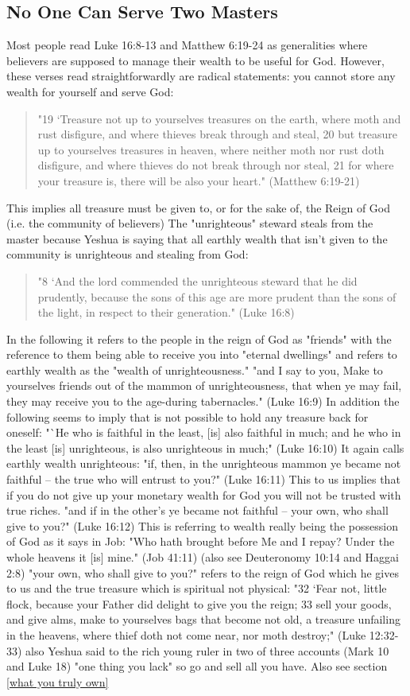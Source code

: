 \documentclass[11pt]{article}
\begin{document}
\subsection{No One Can Serve Two Masters}
Most people read Luke 16:8-13 and Matthew 6:19-24 as generalities where believers are supposed to manage their wealth to be useful for God. However, these verses read straightforwardly are radical statements: you cannot store any wealth for yourself and serve God:
\begin{quote} "19 `Treasure not up to yourselves treasures on the earth, where moth and rust disfigure, and where thieves break through and steal, 20 but treasure up to yourselves treasures in heaven, where neither moth nor rust doth disfigure, and where thieves do not break through nor steal, 21 for where your treasure is, there will be also your heart." (Matthew 6:19-21)
\end{quote}
This implies all treasure must be given to, or for the sake of, the Reign of God (i.e. the community of believers) 
The "unrighteous" steward steals from the master because Yeshua is saying that all earthly wealth that isn't given to the community is unrighteous and stealing from God:  
\begin{quote}
"8 ‘And the lord commended the unrighteous steward that he did prudently, because the sons of this age are more prudent than the sons of the light, in respect to their generation." (Luke 16:8)
\end{quote}
In the following it refers to the people in the reign of God as "friends" with the reference to them being able to receive you into "eternal dwellings" and refers to earthly wealth as the "wealth of unrighteousness." "and I say to you, Make to yourselves friends out of the mammon of unrighteousness, that when ye may fail, they may receive you to the age-during tabernacles." (Luke 16:9) In addition the following seems to imply that is not possible to hold any treasure back for oneself: "`He who is faithful in the least, [is] also faithful in much; and he who in the least [is] unrighteous, is also unrighteous in much;" (Luke 16:10) It again calls earthly wealth unrighteous: "if, then, in the unrighteous mammon ye became not faithful -- the true who will entrust to you?" (Luke 16:11) This to us implies that if you do not give up your monetary wealth for God you will not be trusted with true riches. "and if in the other's ye became not faithful -- your own, who shall give to you?" (Luke 16:12) This is referring to wealth really being the possession of God as it says in Job: "Who hath brought before Me and I repay? Under the whole heavens it [is] mine." (Job 41:11) (also see Deuteronomy 10:14 and Haggai 2:8) "your own, who shall give to you?" refers to the reign of God which he gives to us and the true treasure which is spiritual not physical: "32 `Fear not, little flock, because your Father did delight to give you the reign; 33 sell your goods, and give alms, make to yourselves bags that become not old, a treasure unfailing in the heavens, where thief doth not come near, nor moth destroy;" (Luke 12:32-33) also Yeshua said to the rich young ruler in two of three accounts (Mark 10 and Luke 18) "one thing you lack" so go and sell all you have. Also see section \ref{what you truly own} 
\end{document}

